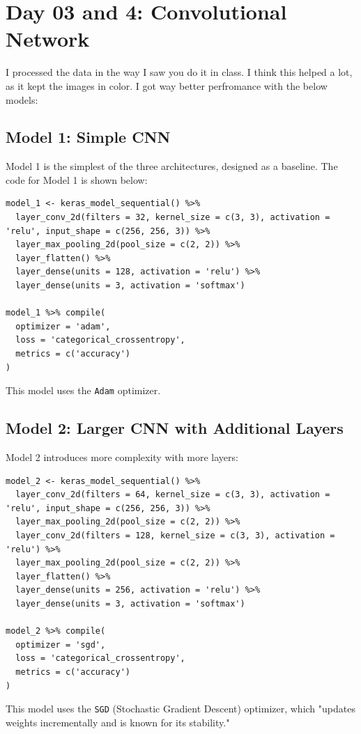 \documentclass{article}
\begin{document}
\section{Day 03 and 4: Convolutional Network}
I processed the data in the way I saw you do it in class. I think this helped a lot, as it kept the images in color. I got way better perfromance with the below models:


\subsection{Model 1: Simple CNN}
Model 1 is the simplest of the three architectures, designed as a baseline. The code for Model 1 is shown below:

\begin{verbatim}
model_1 <- keras_model_sequential() %>%
  layer_conv_2d(filters = 32, kernel_size = c(3, 3), activation = 'relu', input_shape = c(256, 256, 3)) %>%
  layer_max_pooling_2d(pool_size = c(2, 2)) %>%
  layer_flatten() %>%
  layer_dense(units = 128, activation = 'relu') %>%
  layer_dense(units = 3, activation = 'softmax')

model_1 %>% compile(
  optimizer = 'adam',
  loss = 'categorical_crossentropy',
  metrics = c('accuracy')
)
\end{verbatim}

This model uses the \texttt{Adam} optimizer.

\subsection{Model 2: Larger CNN with Additional Layers}
Model 2 introduces more complexity with more layers:


\begin{verbatim}
model_2 <- keras_model_sequential() %>%
  layer_conv_2d(filters = 64, kernel_size = c(3, 3), activation = 'relu', input_shape = c(256, 256, 3)) %>%
  layer_max_pooling_2d(pool_size = c(2, 2)) %>%
  layer_conv_2d(filters = 128, kernel_size = c(3, 3), activation = 'relu') %>%
  layer_max_pooling_2d(pool_size = c(2, 2)) %>%
  layer_flatten() %>%
  layer_dense(units = 256, activation = 'relu') %>%
  layer_dense(units = 3, activation = 'softmax')

model_2 %>% compile(
  optimizer = 'sgd',
  loss = 'categorical_crossentropy',
  metrics = c('accuracy')
)
\end{verbatim}

This model uses the \texttt{SGD} (Stochastic Gradient Descent) optimizer, which "updates weights incrementally and is known for its stability." 
\end{document}
